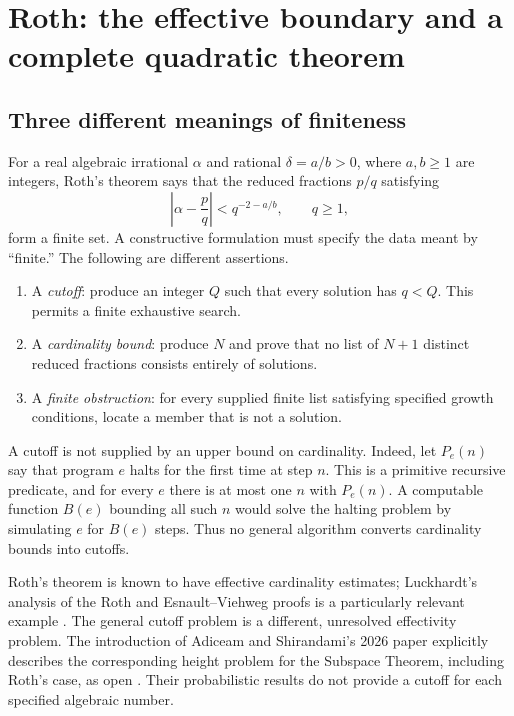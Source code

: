 \section{Roth: the effective boundary and a complete quadratic theorem}
\label{sec:roth}

\subsection{Three different meanings of finiteness}

For a real algebraic irrational $\alpha$ and rational $\delta=a/b>0$, where
$a,b\geq1$ are integers, Roth's theorem says that the reduced fractions
$p/q$ satisfying
\begin{equation}\label{eq:roth-inequality}
  \left|\alpha-\frac pq\right|<q^{-2-a/b},\qquad q\geq1,
\end{equation}
form a finite set.  A constructive formulation must specify the data meant by
``finite.''  The following are different assertions.
\begin{enumerate}
\item A \emph{cutoff}: produce an integer $Q$ such that every solution has
$q<Q$.  This permits a finite exhaustive search.
\item A \emph{cardinality bound}: produce $N$ and prove that no list of $N+1$
distinct reduced fractions consists entirely of solutions.
\item A \emph{finite obstruction}: for every supplied finite list satisfying
specified growth conditions, locate a member that is not a solution.
\end{enumerate}
A cutoff is not supplied by an upper bound on cardinality.  Indeed, let
$P_e(n)$ say that program $e$ halts for the first time at step $n$.  This is a
primitive recursive predicate, and for every $e$ there is at most one $n$
with $P_e(n)$.  A computable function $B(e)$ bounding all such $n$ would
solve the halting problem by simulating $e$ for $B(e)$ steps.  Thus no general
algorithm converts cardinality bounds into cutoffs.

Roth's theorem is known to have effective cardinality estimates; Luckhardt's
analysis of the Roth and Esnault--Viehweg proofs is a particularly relevant
example \cite{Luckhardt1989,KohlenbachHerbrand}.  The general cutoff problem
is a different, unresolved effectivity problem.  The introduction of
Adiceam and Shirandami's 2026 paper explicitly describes the corresponding
height problem for the Subspace Theorem, including Roth's case, as open
\cite{AdiceamShirandami2026}.  Their probabilistic results do not provide a
cutoff for each specified algebraic number.

